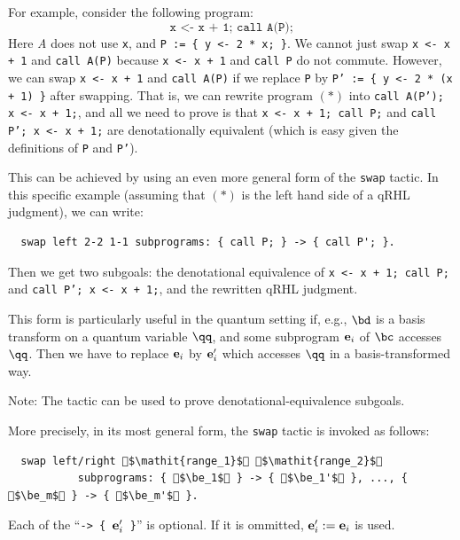 \documentclass{article}
\begin{document}
For example, consider the following program:
\begin{equation*}
  \texttt{x <- x + 1; call A(P);}
  \tag{\ensuremath*}
\end{equation*}
Here \emph{A} does not use \texttt{x}, and \texttt{P := \{ y <- 2 * x; \}}.
We cannot just swap \texttt{x <- x + 1} and \texttt{call A(P)} because \texttt{x <- x + 1} and \texttt{call P} do not commute.
However, we can swap \texttt{x <- x + 1} and \texttt{call A(P)} if we replace \texttt{P} by \texttt{P' := \{ y <- 2 * (x + 1) \}} after swapping.
That is, we can rewrite program $(*)$ into \texttt{call A(P'); x <- x + 1;}, and all we need to prove is that \texttt{x <- x + 1; call P;} and \texttt{call P'; x <- x + 1;} are denotationally equivalent (which is easy given the definitions of \texttt{P} and \texttt{P'}).

This can be achieved by using an even more general form of the \texttt{swap} tactic.
In this specific example (assuming that $(*)$ is the left hand side of a qRHL judgment), we can write:
\begin{lstlisting}
  swap left 2-2 1-1 subprograms: { call P; } -> { call P'; }.
\end{lstlisting}
Then we get two subgoals: the denotational equivalence of \texttt{x <- x + 1; call P;} and \texttt{call P'; x <- x + 1;}, and the rewritten qRHL judgment.

\medskip

This form is particularly useful in the quantum setting if, e.g., $\bd$ is a basis transform on a quantum variable $\qq$, and some subprogram $\mathbf e_i$ of $\bc$ accesses $\qq$.
Then we have to replace $\mathbf e_i$ by $\mathbf e_i'$ which accesses $\qq$ in a basis-transformed way.

Note: The  tactic can be used to prove denotational-equivalence subgoals.

\medskip

More precisely, in its most general form, the \texttt{swap} tactic is invoked as follows:
\begin{lstlisting}
  swap left/right $\mathit{range_1}$ $\mathit{range_2}$
           subprograms: { $\be_1$ } -> { $\be_1'$ }, ..., { $\be_m$ } -> { $\be_m'$ }.
\end{lstlisting}
Each of the ``\texttt{-> \{\,$\mathbf e_i'$\,\}}'' is optional. If it is ommitted, $\mathbf e_i':=\mathbf e_i$ is used.
\end{document}
